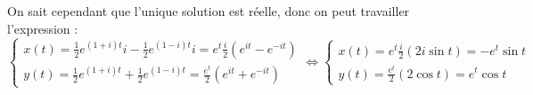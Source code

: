 \documentclass[11pt]{article}
\begin{document}
\begin{exercice}{}{}
    On sait cependant que l'unique solution est réelle, donc on peut travailler l'expression :
    \begin{equation*}
        \begin{cases}
            x(t) = \frac{1}{2}e^{(1+i)t}i - \frac{1}{2}e^{(1-i)t}i = e^t\frac{i}{2}(e^{it}-e^{-it})\\
            y(t) = \frac{1}{2}e^{(1+i)t} + \frac{1}{2}e^{(1-i)t} = \frac{e^t}{2}(e^{it} + e^{-it})
        \end{cases} \iff \begin{cases}x(t) = e^t \frac{i}2{(2i\sin t)} = -e^t\sin t \\ y(t) = \frac{e^t}{2}(2\cos t) = e^t \cos t\end{cases}
    \end{equation*}
\end{exercice}

\vspace*{-0.8cm}
\end{document}
